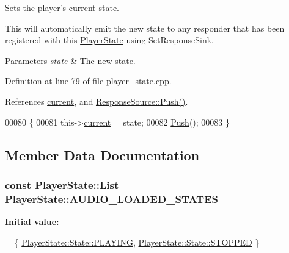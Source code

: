 Sets the player's current state. 

This will automatically emit the new state to any responder that has been registered with this \hyperlink{classPlayerState}{Player\+State} using Set\+Response\+Sink. 
\begin{DoxyParams}{Parameters}
{\em state} & The new state. \\
\hline
\end{DoxyParams}


Definition at line \hyperlink{player__state_8cpp_source_l00079}{79} of file \hyperlink{player__state_8cpp_source}{player\+\_\+state.\+cpp}.



References \hyperlink{player__state_8hpp_source_l00086}{current}, and \hyperlink{io__response_8cpp_source_l00047}{Response\+Source\+::\+Push()}.


\begin{DoxyCode}
00080 \{
00081     this->\hyperlink{classPlayerState_add16beba271881c0e1e40430b80f5bd6}{current} = state;
00082     \hyperlink{classResponseSource_a6e3b93326ee043f6d60510acd08de69b}{Push}();
00083 \}
\end{DoxyCode}


\subsection{Member Data Documentation}
\hypertarget{classPlayerState_a850bf90685a377001cfc46808cf017a4}{
\subsubsection[{A\+U\+D\+I\+O\+\_\+\+L\+O\+A\+D\+E\+D\+\_\+\+S\+T\+A\+T\+E\+S}]{\setlength{\rightskip}{0pt plus 5cm}const {\bf Player\+State\+::\+List} Player\+State\+::\+A\+U\+D\+I\+O\+\_\+\+L\+O\+A\+D\+E\+D\+\_\+\+S\+T\+A\+T\+E\+S\hspace{0.3cm}{\ttfamily [static]}}}\label{classPlayerState_a850bf90685a377001cfc46808cf017a4}
{\bfseries Initial value\+:}
\begin{DoxyCode}
= \{
    \hyperlink{classPlayerState_ab013f68ff23d69d677faae624b5dff07a50366a49630a416ab3ccaa004196027e}{PlayerState::State::PLAYING}, 
      \hyperlink{classPlayerState_ab013f68ff23d69d677faae624b5dff07a09d4d696b4e935115b9313e3c412509a}{PlayerState::State::STOPPED}
\}
\end{DoxyCode}


